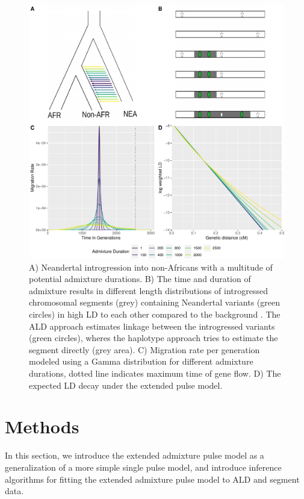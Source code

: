 \documentclass[]{article}
\begin{document}
\begin{figure}
\centering
\includegraphics{Admixture_Time_Inference_Paper_Draft_files/figure-latex/fig1-1.pdf}
\caption{\label{fig:fig1} A) Neandertal introgression into non-Africans with a multitude of potential admixture durations. B) The time and duration of admixture results in different length distributions of introgressed chromosomal segments (grey) containing  Neandertal variants (green circles)  in high LD to each other
compared to the background . The ALD approach estimates linkage
between the introgressed variants (green circles), wheres the haplotype approach tries
to estimate the segment directly (grey area). C) Migration rate per generation
modeled using a Gamma distribution for different admixture durations,
dotted line indicates maximum time of gene flow. D) The expected LD
decay under the extended pulse model.}
\end{figure}

\section{Methods}\label{methods}
In this section,  we introduce the extended admixture pulse model as a generalization of a more simple single pulse model, and introduce inference algorithms for fitting the extended admixture pulse model to ALD and segment data. 
\end{document}
